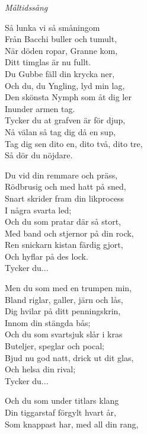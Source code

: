 {\footnotesize\textit{Måltidssång}}\par
\vspace{10pt}
Så lunka vi så småningom\\
Från Bacchi buller och tumult,\\
När döden ropar, Granne kom,\\
Ditt timglas är nu fullt.\\
Du Gubbe fäll din krycka ner,\\
Och du, du Yngling, lyd min lag,\\
Den skönsta Nymph som åt dig ler\\
Inunder armen tag.\\
Tycker du at grafven är för djup,\\
Nå välan så tag dig då en sup,\\
Tag dig sen dito en, dito två, dito tre,\\
Så dör du nöjdare.\par
\vspace{10pt}
Du vid din remmare och präss,\\
Rödbrusig och med hatt på sned,\\
Snart skrider fram din likprocess\\
I några svarta led;\\
Och du som pratar där så stort,\\
Med band och stjernor på din rock,\\
Ren snickarn kistan färdig gjort,\\
Och hyflar på des lock.\\
Tycker du...\par
\newpage
Men du som med en trumpen min,\\
Bland riglar, galler, järn och lås,\\
Dig hvilar på ditt penningskrin,\\
Innom din stängda bås;\\
Och du som svartsjuk slår i kras\\
Buteljer, speglar och pocal;\\
Bjud nu god natt, drick ut dit glas,\\
Och helsa din rival;\\
Tycker du...\par
\vspace{10pt}
Och du som under titlars klang\\
Din tiggarstaf förgylt hvart år,\\
Som knappast har, med all din rang,\\
